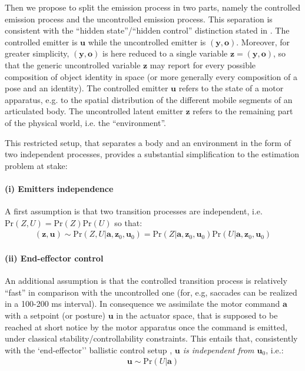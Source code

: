 \documentclass[12pt,twoside,openright]{article}
\begin{document}
Then we propose to split the {\color{Purple} emission} process in two parts, namely the controlled {\color{Purple} emission} process and the uncontrolled {\color{Purple} emission} process. 
This separation 
is consistent with the ``hidden state''/``hidden control'' distinction stated in \citep{friston2012perceptions}.
The controlled emitter is $\boldsymbol{u}$ while the uncontrolled emitter is  $(\boldsymbol{y}, \boldsymbol{o})$. 
Moreover, for greater simplicity, $(\boldsymbol{y},\boldsymbol{o})$ is here reduced to a single variable $\boldsymbol{z} = (\boldsymbol{y}, \boldsymbol{o})$, 
so that the generic uncontrolled variable $\boldsymbol{z}$ may report for every possible composition of object identity in space (or more generally every composition of a pose and an identity).
The controlled emitter $\boldsymbol{u}$ refers to the state of a motor apparatus, e.g. to the spatial distribution of the different mobile segments of an articulated body. The uncontrolled latent emitter $\boldsymbol{z}$  refers to the remaining part of the physical world, i.e. the ``environment''. 

This restricted setup, that separates a body and an environment in the form of two {\color{Purple}independent} processes,  provides a substantial simplification to the estimation problem at stake: 
\paragraph{(i) Emitters independence}
A first assumption is that two {\color{Purple} transition processes} are independent, i.e. $\text{Pr}(Z,U) = \text{Pr}(Z)\text{Pr}(U)$ so that:
\begin{align}
(\boldsymbol{z},\boldsymbol{u}) \sim \text{Pr}(Z,U|\boldsymbol{a}, \boldsymbol{z}_0, \boldsymbol{u}_0) = \text{Pr}(Z|\boldsymbol{a}, \boldsymbol{z}_0, \boldsymbol{u}_0) \text{Pr}(U|\boldsymbol{a}, \boldsymbol{z}_0, \boldsymbol{u}_0)\nonumber
\end{align}
	
\paragraph{(ii) End-effector control}
An additional assumption is that the controlled {\color{Purple} transition} process is relatively ``fast'' in comparison with the uncontrolled one
(for, e.g, saccades can be realized in a 100-200 ms interval). 
In consequence we assimilate the motor command $\boldsymbol{a}$ with a setpoint (or posture) $\boldsymbol{u}$ in the actuator space, that is supposed to be reached 
at short notice by the motor apparatus once the command is emitted, under classical stability/controllability constraints.
This entails that, consistently with the `end-effector'' ballistic control setup \citep{mussa2004neural},  \emph{$\boldsymbol{u}$ is independent from $\boldsymbol{u}_0$},
i.e.:
\begin{align*}
\boldsymbol{u}\sim\text{Pr}(U|\boldsymbol{a})
\end{align*}
\end{document}
